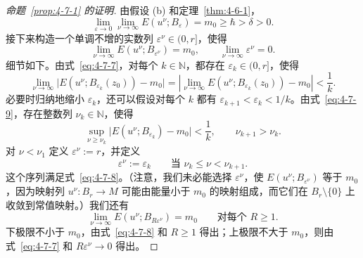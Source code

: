 \begin{proof}[命题~\ref{prop:4-7-1} 的证明]
由假设 (b) 和定理~\ref{thm:4-6-1}，
\begin{equation}\label{eq:4-7-7}
  \lim_{\varepsilon\to0}\lim_{\nu\to\infty}
  E(u^\nu;B_\varepsilon)
  =m_0\ge\hbar>\delta>0.
\end{equation}
接下来构造一个单调不增的实数列 $\varepsilon^\nu\in(0,r]$，使得
\begin{equation}\label{eq:4-7-8}
  \lim_{\nu\to\infty}E(u^\nu;B_{\varepsilon^\nu})=m_0,
  \qquad
  \lim_{\nu\to\infty}\varepsilon^\nu=0.
\end{equation}
细节如下。由式~\eqref{eq:4-7-7}，对每个 $k\in\mathbb N$，都存在
$\varepsilon_k\in(0,r]$，使得
\begin{equation}\label{eq:4-7-9}
  \lim_{\nu\to\infty}
  \bigl|E(u^\nu;B_{\varepsilon_k}(z_0))-m_0\bigr|
  =\left|\lim_{\nu\to\infty}
  E(u^\nu;B_{\varepsilon_k}(z_0))-m_0\right|
  <\frac1k.
\end{equation}
必要时归纳地缩小 $\varepsilon_k$，还可以假设对每个 $k$ 都有
$\varepsilon_{k+1}<\varepsilon_k<1/k$。由式~\eqref{eq:4-7-9}，存在整数列
$\nu_k\in\mathbb N$，使得
\[
  \sup_{\nu\ge\nu_k}
  \bigl|E(u^\nu;B_{\varepsilon_k})-m_0\bigr|<\frac1k,
  \qquad
  \nu_{k+1}>\nu_k.
\]
对 $\nu<\nu_1$ 定义 $\varepsilon^\nu:=r$，并定义
\[
  \varepsilon^\nu:=\varepsilon_k
  \qquad\text{当 }\nu_k\le\nu<\nu_{k+1}.
\]
这个序列满足式~\eqref{eq:4-7-8}。（注意，我们未必能选择 $\varepsilon^\nu$，使
$E(u^\nu;B_{\varepsilon^\nu})$ 等于 $m_0$，因为映射列
$u^\nu:B_r\to M$ 可能由能量小于 $m_0$ 的映射组成，而它们在
$B_r\setminus\{0\}$ 上收敛到常值映射。）我们还有
\begin{equation}\label{eq:4-7-10}
  \lim_{\nu\to\infty}E(u^\nu;B_{R\varepsilon^\nu})=m_0
  \qquad\text{对每个 }R\ge1.
\end{equation}
下极限不小于 $m_0$，由式~\eqref{eq:4-7-8} 和 $R\ge1$ 得出；上极限不大于
$m_0$，则由式~\eqref{eq:4-7-7} 和 $R\varepsilon^\nu\to0$ 得出。


\end{proof}
